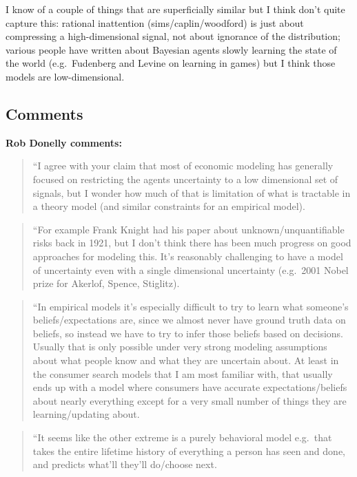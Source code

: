 \documentclass[
  10pt,
  letterpaper,
  DIV=11,
  numbers=noendperiod,
  oneside]{scrartcl}
\begin{document}
I know of a couple of things that are superficially similar but I think
don't quite capture this: rational inattention (sims/caplin/woodford) is
just about compressing a high-dimensional signal, not about ignorance of
the distribution; various people have written about Bayesian agents
slowly learning the state of the world (e.g.~Fudenberg and Levine on
learning in games) but I think those models are low-dimensional.

\subsection{Comments}\label{comments}

\textbf{Rob Donelly comments:}

\begin{quote}
``I agree with your claim that most of economic modeling has generally
focused on restricting the agents uncertainty to a low dimensional set
of signals, but I wonder how much of that is limitation of what is
tractable in a theory model (and similar constraints for an empirical
model).
\end{quote}

\begin{quote}
``For example Frank Knight had his paper about unknown/unquantifiable
risks back in 1921, but I don't think there has been much progress on
good approaches for modeling this. It's reasonably challenging to have a
model of uncertainty even with a single dimensional uncertainty
(e.g.~2001 Nobel prize for Akerlof, Spence, Stiglitz).
\end{quote}

\begin{quote}
``In empirical models it's especially difficult to try to learn what
someone's beliefs/expectations are, since we almost never have ground
truth data on beliefs, so instead we have to try to infer those beliefs
based on decisions. Usually that is only possible under very strong
modeling assumptions about what people know and what they are uncertain
about. At least in the consumer search models that I am most familiar
with, that usually ends up with a model where consumers have accurate
expectations/beliefs about nearly everything except for a very small
number of things they are learning/updating about.
\end{quote}

\begin{quote}
``It seems like the other extreme is a purely behavioral model e.g.~that
takes the entire lifetime history of everything a person has seen and
done, and predicts what'll they'll do/choose next.
\end{quote}
\end{document}
